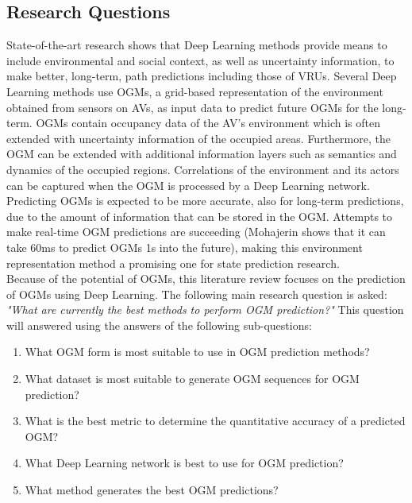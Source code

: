 \subsection{Research Questions}
State-of-the-art research shows that Deep Learning methods provide means to include environmental and social context, as well as uncertainty information, to make better, long-term, path predictions including those of \glspl{VRU}. Several Deep Learning methods use \glspl{OGM}, a grid-based representation of the environment obtained from sensors on \glspl{AV}, as input data to predict future \glspl{OGM} for the long-term. \glspl{OGM} contain occupancy data of the \gls{AV}'s environment which is often extended with uncertainty information of the occupied areas. Furthermore, the \gls{OGM} can be extended with additional information layers such as semantics and dynamics of the occupied regions. Correlations of the environment and its actors can be captured when the \gls{OGM} is processed by a Deep Learning network. Predicting \glspl{OGM} is expected to be more accurate, also for long-term predictions, due to the amount of information that can be stored in the OGM. Attempts to make real-time \gls{OGM} predictions are succeeding (Mohajerin \cite{mohajerin2019multi} shows that it can take 60ms to predict \glspl{OGM} 1s into the future), making this environment representation method a promising one for state prediction research. \\
 
Because of the potential of \glspl{OGM}, this literature review focuses on the prediction of \glspl{OGM} using Deep Learning. The following main research question is asked: \textit{"What are currently the best methods to perform \gls{OGM} prediction?"} 
This question will answered using the answers of the following sub-questions:

\begin{enumerate}
	\item What OGM form is most suitable to use in OGM prediction methods?
	\item What dataset is most suitable to generate OGM sequences for OGM prediction?
	\item What is the best metric to determine the quantitative accuracy of a predicted OGM?
	\item What Deep Learning network is best to use for OGM prediction?
	\item What method generates the best OGM predictions?
\end{enumerate}


